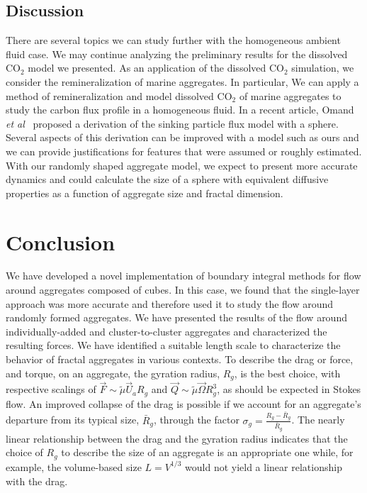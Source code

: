 \subsection{Discussion}
 
 There are several topics we can study further with the homogeneous ambient fluid case. We may continue analyzing the preliminary results for the dissolved CO$_2$ model we presented.
 As an application of the dissolved CO$_2$ simulation, we consider the remineralization of marine aggregates. In particular, We can apply a method of remineralization and model dissolved CO$_2$ of marine aggregates to study the carbon flux profile in a homogeneous fluid.
 In a recent article, Omand {\it{et al}}~\cite{omand_sinking_2020} proposed a derivation of the sinking particle flux model with a sphere.
 Several aspects of this derivation can be improved with a model such as ours and we can provide justifications for features that were assumed or roughly estimated.
  With our randomly shaped aggregate model, we expect to present more accurate dynamics and could calculate the size of a sphere with equivalent diffusive properties as a function of aggregate size and fractal dimension.

\section{Conclusion}
\label{sec:conclusion}

We have developed a novel implementation of boundary integral methods for flow around aggregates composed of cubes. In this case, we found that the single-layer approach was more accurate and therefore used it to study the flow around randomly formed aggregates.
We have presented the results of the flow around individually-added and cluster-to-cluster aggregates and characterized the resulting forces. We have identified a suitable length scale to characterize the behavior of fractal aggregates in various contexts. To describe the drag or force, and torque, on an aggregate, the gyration radius, $R_g$, is the best choice, with respective scalings of $\vec{F} \sim \tilde{\mu} \vec{U}_a R_g$ and $\vec{Q} \sim \tilde{\mu} \vec{\Omega} R_g^3$, as should be expected in Stokes flow. 
An improved collapse of the drag is possible if we account for an aggregate's departure from its typical size, $\bar{R}_g$, through the factor $\sigma_g = \frac{R_g - \bar{R}_g}{\bar{R}_g}$. 
The nearly linear relationship between the drag and the gyration radius indicates that the choice of $R_g$ to describe the size of an aggregate is an appropriate one while, for example, the volume-based size $L=V^{1/3}$ would not yield a linear relationship with the drag.  



